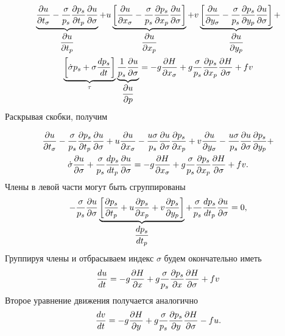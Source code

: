 \begin{multline*}
    \underbrace{\pd{u}{t_{\sigma}}-\frac{\sigma}{p_s}\pd{p_s}{t_p}\pd{u}{\sigma}}_{\pd{u}{t_p}} + 
    u\underbrace{\left[ \pd{u}{x_{\sigma}} - \frac{\sigma}{p_s} \pd{p_s}{x_p} \pd{u}{\sigma} \right]}_{\pd{u}{x_p}} + 
    v\underbrace{\left[ \pd{u}{y_{\sigma}} - \frac{\sigma}{p_s} \pd{p_s}{y_p} \pd{u}{\sigma} \right]}_{\pd{u}{y_p}} + \\
    \underbrace{\left[ \dot{\sigma}p_s + \sigma\td{p_s}{t} \right]}_{\tau} \underbrace{\frac{1}{p_s}\pd{u}{\sigma}}_{\pd{u}{p}} = 
    -g\pd{H}{x_{\sigma}} + g\frac{\sigma}{p_s}\pd{p_s}{x_p}\pd{H}{\sigma} + fv
\end{multline*}
Раскрывая скобки, получим

\begin{multline*}
    \pd{u}{t_{\sigma}} - 
    \frac{\sigma}{p_s}\pd{p_s}{t_p}\pd{u}{\sigma} + 
        u\pd{u}{x_{\sigma}} - \frac{u\sigma}{p_s}\pd{u}{\sigma}\pd{p_s}{x_p} + 
        v\pd{u}{y_{\sigma}} - \frac{u\sigma}{p_s}\pd{u}{\sigma}\pd{p_s}{y_p} + \\
        \dot{\sigma}\pd{u}{\sigma} + 
        \frac{\sigma}{p_s}\td{p_s}{t_p}\pd{u}{\sigma} = 
        -g\pd{H}{x_{\sigma}}+g\frac{\sigma}{p_s}\pd{p_s}{x_p}\pd{H}{\sigma}+fv.
\end{multline*}
Члены в левой части могут быть сгруппированы
\begin{equation*}
    -\frac{\sigma}{p_s}\pd{u}{\sigma} \underbrace{\left[ \pd{p_s}{t_p}+u\pd{p_s}{x_p}+v\pd{p_s}{y_p} \right]}_{\td{p_s}{t_p}} + 
    \frac{\sigma}{p_s}\td{p_s}{t_p}\pd{u}{\sigma} = 0,
\end{equation*}
Группируя члены и отбрасываем индекс $\sigma$ будем окончательно иметь
\begin{equation}
    \label{eq:dudt_sigma}
    \td{u}{t} = -g\pd{H}{x}+g\frac{\sigma}{p_s}\pd{p_s}{x}\pd{H}{\sigma}+fv
\end{equation}
Второе уравнение движения получается аналогично
\begin{equation}
    \label{eq:dvdt_sigma}
    \td{v}{t} = -g\pd{H}{y}+g\frac{\sigma}{p_s}\pd{p_s}{y}\pd{H}{\sigma}-fu.
\end{equation}

